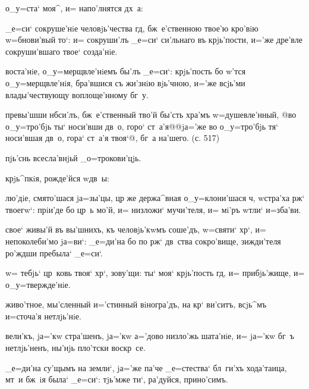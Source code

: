   о_у=ста` моя^, и= напо'лнятся 
дх~а:

 _е=си` сокруше'нiе человjь'чества 
гд, бж~е'ственною твое'ю кро'вiю w=бнови'вый то`: и= 
сокруши'лъ _е=си` си'льнаго въ крjь'пости, и='же дре'вле 
сокруши'вшаго твое` созда'нiе.

 воста'нiе, о_у=мерщвле'нiемъ бы'лъ 
_е=си`: крjь'пость бо w'тся о_у=мерщвле'нiя, бра'вшися 
съ жи'знiю вjь'чною, и='же всjь'ми влады'чествующу 
воплоще'нному бг~у.

  превы'шши нб си'лъ, 
бж~е'ственный тво'й бы'сть хра'мъ w=душевле'нный, @во 
о_у=тро'бjь ты` носи'вши дв~о, горо` ст~а'я@{@jа='же во 
о_у=тро'бjь тя` носи'вшая дв~о, гора` ст~а'я твоя`@}, 
бг~а на'шего. (с. 517)

    \kinovarsimple{[_е=гw'же}   пjь'снь всесла'внjьй 
_о=трокови'цjь.\kinovarsimple{] Гла'съ д~.}


 крjь^пкiя, рожде'йся w\т дв~ы:

 лю'дiе, смято'шася jа=зы'цы, цр 
же держа^вная о_у=клони'шася ч, w\т стра'ха рж` 
твоегw`: прiи'де бо цр~ь мо'й, и= низложи` мучи'теля, и= 
мi'ръ w\т тли` и=зба'ви.

 свое` живы'й въ вы'шнихъ, къ человjь'кwмъ 
соше'дъ, w=святи` хр`, и= непоколеби'мо jа=ви`: 
_е=ди'на бо по рж` дв~ства сокро'вище, зижди'теля 
ро'ждши пребыла` _е=си`.


 w= тебjь` цр~ковь твоя` 
хр`, зову'щи: ты` моя` крjь'пость гд, и= 
прибjь'жище, и= о_у=твержде'нiе.

 живо'тное, мы'сленный и='стинный 
вiногра'дъ, на кр` ви'ситъ, всjь^мъ и=сточа'я 
нетлjь'нiе.

 вели'къ, jа='кw стра'шенъ, jа='кw а='дово 
низло'жь шата'нiе, и= jа='кw бг~ъ нетлjь'ненъ, ны'нjь 
пло'тски воскр~се.

  _е=ди'на су'щымъ на земли`, 
jа='же па'че _е=стества` бл~ги'хъ хода'таица, мт~и бж~iя 
была` _е=си`: тjь'мже ти`, ра'дуйся, прино'симъ.

